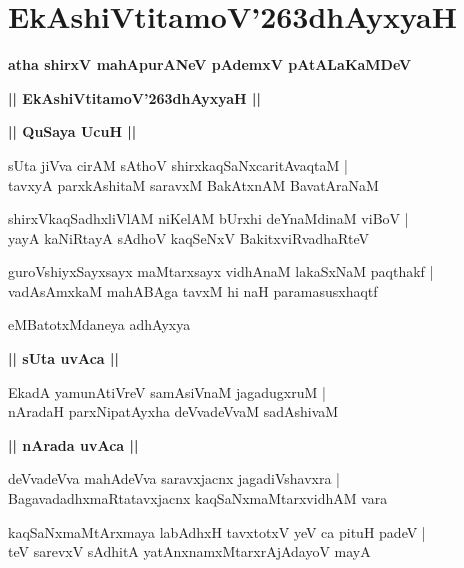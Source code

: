 \documentclass[twoside,12pt,openright]{book}
\def\S{\char'263}
\newcounter{shloka}[chapter]
\def\uvaca#1{\centerline{{\large\textbf{#1}}}}
\begin{document}
\chapter{EkAshiVtitamoV\S dhAyxyaH}

\begin{center}
{\LARGE\bfseries atha shirxV mahApurANeV pAdemxV pAtALaKaMDeV }
\end{center}

\begin{center}         
{\LARGE\bfseries || EkAshiVtitamoV\S dhAyxyaH ||}
\end{center}

\uvaca{|| QuSaya UcuH ||}

\begin{shloka}%
sUta jiVva cirAM sAthoV shirxkaqSaNxcaritAvaqtaM |\\
tavxyA parxkAshitaM saravxM BakAtxnAM BavatAraNaM 
\end{shloka}

\begin{shloka}%
shirxVkaqSadhxliVlAM niKelAM bUrxhi deYnaMdinaM viBoV |\\
yayA kaNiRtayA sAdhoV kaqSeNxV BakitxviRvadhaRteV 
\end{shloka}

\begin{shloka}%
guroVshiyxSayxsayx maMtarxsayx vidhAnaM lakaSxNaM paqthakf |\\
vadAsAmxkaM mahABAga tavxM hi naH paramasusxhaqtf
\end{shloka}

\begin{center}
eMBatotxMdaneya adhAyxya
\end{center}

\uvaca{|| sUta uvAca ||}

\begin{shloka}%
EkadA yamunAtiVreV samAsiVnaM jagadugxruM |\\
nAradaH parxNipatAyxha deVvadeVvaM sadAshivaM 
\end{shloka}

\uvaca{|| nArada uvAca ||}

\begin{shloka}%
deVvadeVva mahAdeVva saravxjacnx jagadiVshavxra |\\
BagavadadhxmaRtatavxjacnx kaqSaNxmaMtarxvidhAM vara
\end{shloka}

\begin{shloka}%
kaqSaNxmaMtArxmaya labAdhxH tavxtotxV yeV ca pituH padeV |\\
teV sarevxV sAdhitA yatAnxnamxMtarxrAjAdayoV mayA
\end{shloka}
\end{document}
